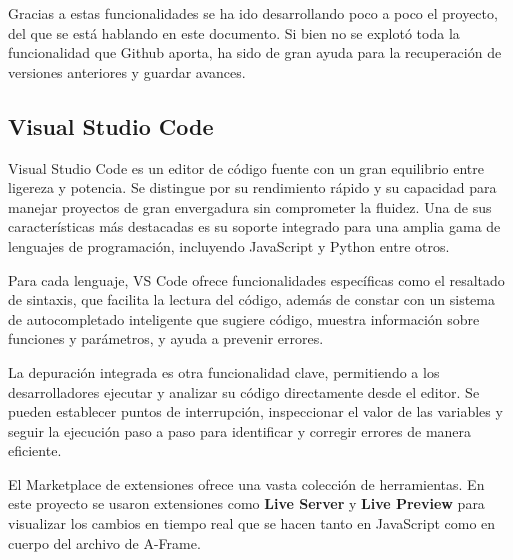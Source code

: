 \documentclass[a4paper, 12pt]{book}
\begin{document}
Gracias a estas funcionalidades se ha ido desarrollando poco a poco el proyecto, del que se está hablando en este documento. Si bien no se explotó toda la funcionalidad que Github aporta, ha sido de gran ayuda para la recuperación de versiones anteriores y guardar avances.
\subsection{Visual Studio Code}
Visual Studio Code es un editor de código fuente con un gran equilibrio entre ligereza y potencia. Se distingue por su rendimiento rápido y su capacidad para manejar proyectos de gran envergadura sin comprometer la fluidez.
Una de sus características más destacadas es su soporte integrado para una amplia gama de lenguajes de programación, incluyendo JavaScript y Python entre otros. 

Para cada lenguaje, VS Code ofrece funcionalidades específicas como el resaltado de sintaxis, que facilita la lectura del código, además de constar con un sistema de autocompletado inteligente que sugiere código, muestra información sobre funciones y parámetros, y ayuda a prevenir errores.

La depuración integrada es otra funcionalidad clave, permitiendo a los desarrolladores ejecutar y analizar su código directamente desde el editor. Se pueden establecer puntos de interrupción, inspeccionar el valor de las variables y seguir la ejecución paso a paso para identificar y corregir errores de manera eficiente.

El Marketplace de extensiones ofrece una vasta colección de herramientas. En este proyecto se usaron extensiones como \textbf{Live Server} y \textbf{Live Preview} para visualizar los cambios en tiempo real que se hacen tanto en JavaScript como en cuerpo del archivo de A-Frame.
\end{document}
